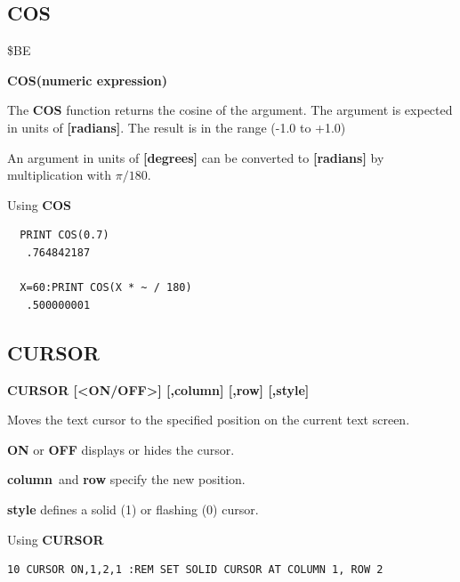 \subsection{COS}
\begin{description}[leftmargin=2cm,style=nextline]
\item [Token:] \$BE
\item [Format:] {\bf COS(numeric expression)}
\item [Usage:] The {\bf COS} function returns the cosine of the
               argument.
               The argument is expected in units of {\bf [radians]}.
               The result is in the range (-1.0 to +1.0)

\item [Remarks:] An argument in units of {\bf [degrees]}
                 can be converted to {\bf [radians]}
               by multiplication with $\pi/180$.
\item [Example:] Using {\bf COS}
\begin{tcolorbox}[colback=black,coltext=white]
\verbatimfont{\codefont}
\begin{verbatim}
  PRINT COS(0.7)
   .764842187

  X=60:PRINT COS(X * ~ / 180)
   .500000001
\end{verbatim}
\end{tcolorbox}
\end{description}


\newpage
\subsection{CURSOR}
\begin{description}[leftmargin=2cm,style=nextline]
\item [Format:] {\bf CURSOR [<ON/OFF>] [,column] [,row] [,style]}
\item [Usage:] Moves the text cursor to
               the specified position on the current text screen.

               {\bf ON} or {\bf OFF} displays or hides the cursor.

               {\bf column} and {\bf row} specify the new position.

               {\bf style} defines a solid (1) or flashing (0) cursor.

\item [Example:] Using {\bf CURSOR}
\begin{tcolorbox}[colback=black,coltext=white]
\verbatimfont{\codefont}
\begin{verbatim}
10 CURSOR ON,1,2,1 :REM SET SOLID CURSOR AT COLUMN 1, ROW 2
\end{verbatim}
\end{tcolorbox}
\end{description}

